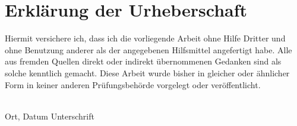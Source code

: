 \vspace*{5cm}
\section*{Erklärung der Urheberschaft}
Hiermit versichere ich, dass ich die vorliegende Arbeit
ohne Hilfe Dritter und ohne Benutzung anderer als der angegebenen
Hilfsmittel angefertigt habe. Alle aus fremden Quellen direkt oder
indirekt übernommenen Gedanken sind als solche kenntlich gemacht. Diese
Arbeit wurde bisher in gleicher oder ähnlicher Form in keiner anderen
Prüfungsbehörde vorgelegt oder veröffentlicht.

\vfill

\noindent\dotfill\\
\hspace{2cm} Ort, Datum \hfill Unterschrift \hspace{2cm}

\vfill\vfill\vfill\vfill\vfill
\newpage
